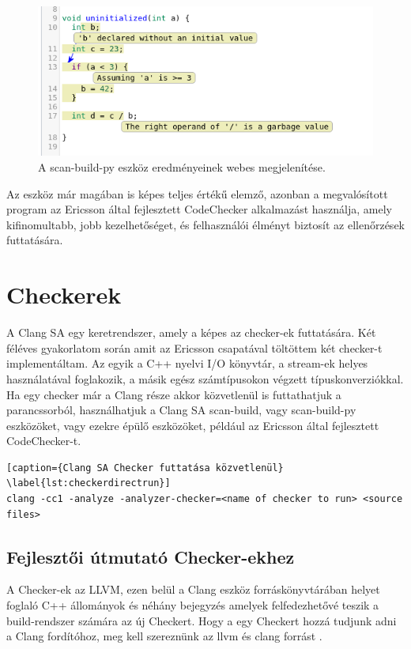 \documentclass[a4paper,12pt]{report}
\begin{document}
\begin{figure}[h]
\caption{A scan-build-py eszköz eredményeinek webes megjelenítése.}
\centering
\includegraphics[scale=0.8]{uninit_web.png}
\end{figure}

Az eszköz már magában is képes teljes értékű elemző, azonban a megvalósított program az Ericsson által fejlesztett CodeChecker \cite{codecheckergit} alkalmazást használja, amely kifinomultabb, jobb kezelhetőséget, és felhasználói élményt biztosít az ellenőrzések futtatására.

\chapter{Checkerek}
A Clang SA egy keretrendszer, amely a képes az checker-ek futtatására. Két féléves gyakorlatom során amit az Ericsson csapatával töltöttem két checker-t implementáltam. Az egyik a C++ nyelvi I/O könyvtár, a stream-ek helyes használatával foglakozik, a másik egész számtípusokon végzett típuskonverziókkal.
Ha egy checker már a Clang része akkor közvetlenül is futtathatjuk a parancssorból, használhatjuk a Clang SA scan-build, vagy scan-build-py eszközöket, vagy ezekre épülő eszközöket, például az Ericsson által fejlesztett CodeChecker-t.

\begin{lstlisting}[caption={Clang SA Checker futtatása közvetlenül}
\label{lst:checkerdirectrun}]
clang -cc1 -analyze -analyzer-checker=<name of checker to run> <source files>
\end{lstlisting}

\section{Fejlesztői útmutató Checker-ekhez}
A Checker-ek az LLVM, ezen belül a Clang eszköz forráskönyvtárában helyet foglaló C++ állományok és néhány bejegyzés amelyek felfedezhetővé teszik a build-rendszer számára az új Checkert. Hogy a egy Checkert hozzá tudjunk adni a Clang fordítóhoz, meg kell szereznünk az llvm és clang forrást \cite{getllvmpage}.
\end{document}
